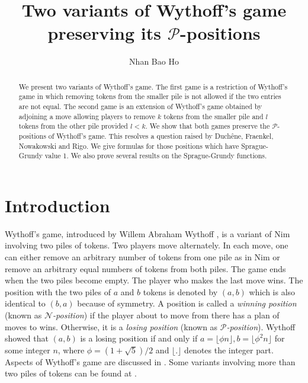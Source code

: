 \documentclass[12pt]{amsart}
\theoremstyle{plain}
\theoremstyle{definition}
\theoremstyle{remark}
\begin{document}
\title{Two variants of Wythoff's game preserving its ${\mathcal{P}}$-positions}

\author{Nhan Bao Ho}
\address{Department of Mathematics, La Trobe University, Melbourne, Australia 3086}


\begin{abstract}
We present two variants of Wythoff's game. The first game is a restriction of Wythoff's game in which removing tokens from the smaller pile is not allowed if the two entries are not equal. The second game is an extension of Wythoff's game obtained by adjoining a move allowing players to remove $k$ tokens from the smaller pile and $l$ tokens from the other pile provided $l < k$. We show that both games preserve the ${\mathcal{P}}$-positions of Wythoff's game. This resolves a question raised by Duch{\^e}ne,  Fraenkel, Nowakowski and Rigo. We give formulas for those positions which have Sprague-Grundy value 1. We also prove several results on the Sprague-Grundy functions.
\end{abstract}

\maketitle

\section{Introduction}
Wythoff's game, introduced by Willem Abraham Wythoff \cite{Wyt}, is a variant of Nim involving two piles of tokens. Two players move alternately. In each move, one can either remove an arbitrary number of tokens from one pile as in Nim or remove an arbitrary equal numbers of tokens from both piles. The game ends when the two piles become empty. The player who makes the last move wins. The position with the two piles of $a$ and $b$ tokens is denoted by $(a,b)$ which is also identical to $(b,a)$ because of symmetry.  A position is called a \emph{winning position} (known as \emph{${\mathcal{N}}$-position}) if the player about to move from there has a plan of moves to wins. Otherwise, it is a \emph{losing position} (known as \emph{${\mathcal{P}}$-position}). Wythoff  showed that $(a,b)$ is a losing position if and only if $a = \lfloor \phi n \rfloor, b = \lfloor \phi^2 n \rfloor$ for some integer $n$, where $\phi = (1+\sqrt{5})/2$ and $\lfloor . \rfloor$ denotes the integer part. Aspects of Wythoff's game are discussed in \cite{blass, Dress, landman, nivasch}. Some variants involving more than two piles of tokens can be found at \cite{Ext-Res, Geo-ext, Nimhoff, End-Wyt, anew}.
\end{document}
